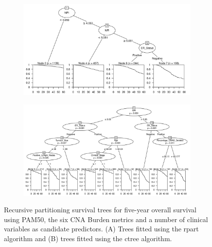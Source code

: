 \begin{figure}[!htb]
\centering

\vspace{1cm}

\begin{subfigure}{\textwidth}
\subcaption{}
\includegraphics[width=1\textwidth]{../figures/Appendices/Appendix_B/Clin_PartyKit_Survival_Burden_FiveYearOS_PAM50.png}
\end{subfigure}

\vspace{2cm}

\begin{subfigure}{\textwidth}
\subcaption{}
\includegraphics[width=1\textwidth]{../figures/Appendices/Appendix_B/Clin_Ctree_Survival_Burden_FiveYearOS_PAM50.png}
\end{subfigure}

\vspace{1cm}

\caption[Recursive partitioning survival trees for five-year overall survival using PAM50, the six CNA Burden metrics and a number of clinical variables as candidate predictors.]{Recursive partitioning survival trees for five-year overall survival using PAM50, the six CNA Burden metrics and a number of clinical variables as candidate predictors. (A) Trees fitted using the rpart algorithm and (B) trees fitted using the ctree algorithm.}
\end{figure}

